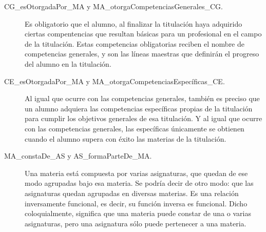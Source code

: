 \begin{description}
 
    		\item [CG\_esOtorgadaPor\_MA y MA\_otorgaCompetenciasGenerales\_CG.] Es obligatorio que el alumno, al finalizar la titulación haya adquirido ciertas compentencias que resultan básicas para un profesional en el campo de la titulación. Estas competencias obligatorias reciben el nombre de competencias generales, y son las líneas maestras que definirán el progreso del alumno en la titulación.
	    	
	    		
    
    		\item [CE\_esOtorgadaPor\_MA y MA\_otorgaCompetenciasEspecíficas\_CE.] Al igual que ocurre con las competencias generales, también es preciso que un alumno adquiera las competencias específicas propias de la titulación para cumplir los objetivos generales de esa titulación. Y al igual que ocurre con las competencias generales, las específicas únicamente se obtienen cuando el alumno supera con éxito las materias de la titulación.
    		
        

    		\item [MA\_constaDe\_AS y AS\_formaParteDe\_MA.] Una materia está compuesta por varias asignaturas, que quedan de ese modo agrupadas bajo esa materia. Se podría decir de otro modo: que las asignaturas quedan agrupadas en diversas materias. Es una relación inversamente funcional, es decir, su función inversa es funcional. Dicho coloquialmente, significa que una materia puede constar de una o varias asignaturas, pero una asignatura sólo puede pertenecer a una materia.
        
        
    

\end{description}
